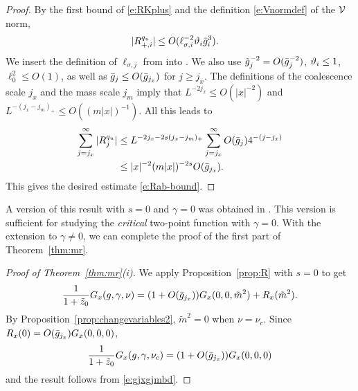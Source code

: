 \begin{proof}
By the first bound of \eqref{e:RKplus} and the definition \eqref{e:Vnormdef}
of the $\mathcal{V}$ norm,
\begin{align}
\label{e:vq-new}
    |R^{q_u}_{+,i}|
&
\le O(\ell_{\sigma,i}^{-2}\vartheta_i\bar{g}_i^{3}).
\end{align}
We insert the definition of $\ell_{\sigma,j}$ from  into .
We also use $\tilde{g}_j^{-2} = O(\bar{g}_j^{-2})$, $\vartheta_i \le 1$, $\ell_0^2 \le O(1)$,
as well as $\bar{g}_{j} \leq O(\bar{g}_{j_{x}})$ for $j \geq j_x$.
The definitions of
the coalescence scale $j_x$ and the mass scale $j_m$ imply that  $L^{-2j_x} \le O(|x|^{-2})$
and $L^{ -  (j_{x} - j_m)_+} \le O((m|x|)^{-1})$.
All this leads to
\begin{align}
\sum_{j = j_{x}}^\infty |R^{q_u}_j|
&\leq
L^{-2j_{x} - 2s (j_{x} - j_m)_+}
\sum_{j = j_{x}}^\infty O(\bar{g}_{j}) 4^{-(j - j_{x})}
\nonumber \\
&\leq
|x|^{-2} (m|x|)^{-2s} O(\bar{g}_{j_{x}})
.
\label{e:vq-sum}
\end{align}
This gives the desired estimate \eqref{e:Rab-bound}.
\end{proof}

A version of this result with $s = 0$ and $\gamma = 0$ was obtained in \cite{BBS-saw4,ST-phi4}.
This version is sufficient for studying the \emph{critical} two-point function with $\gamma = 0$.
With the extension to $\gamma \ne 0$, we can complete the proof of the first part of
Theorem~\ref{thm:mr}.

\begin{proof}[Proof of Theorem~\ref{thm:mr}(i)]
We apply Proposition~\ref{prop:R} with $s = 0$ to get
\begin{equation}
\frac{1}{1 + \tilde z_0} G_x(g, \gamma, \nu)
	=
(1 + O(\bar{g}_{j_x})) G_x(0, 0, \tilde m^2) + R_x(\tilde m^2).
\end{equation}
By Proposition~\ref{prop:changevariables2}, $\tilde m^2 = 0$
when $\nu = \nu_c$. Since $R_x(0) = O(\bar{g}_{j_x}) G_x(0, 0, 0)$,
\begin{equation}
\frac{1}{1 + \tilde z_0} G_x(g, \gamma, \nu_c)
	=
(1 + O(\bar{g}_{j_x})) G_x(0, 0, 0)
\end{equation}
and the result follows from \eqref{e:gjxgjmbd}.
\end{proof}


